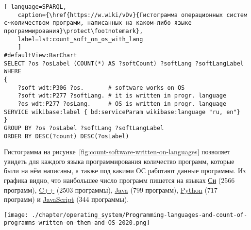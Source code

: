 % 
\begin{lstlisting}[ language=SPARQL, 
	caption={\href{https://w.wiki/vDv}{Гистограмма операционных систем с~количеством программ, написанных на каком-либо языке программирования}\protect\footnotemark},
	label=lst:count_soft_on_os_with_lang
	]
#defaultView:BarChart
SELECT ?os ?osLabel (COUNT(*) AS ?softCount) ?softLang ?softLangLabel
WHERE
{
	?soft wdt:P306 ?os.       # software works on OS
	?soft wdt:P277 ?softLang. # it is written in progr. language
	?os wdt:P277 ?osLang.     # OS is written in progr. language
SERVICE wikibase:label { bd:serviceParam wikibase:language "ru, en"}
}
GROUP BY ?os ?osLabel ?softLang ?softLangLabel
ORDER BY DESC(?count) DESC(?osLabel)
\end{lstlisting}

Гистограмма на рисунке~\ref{fig:count-software-written-on-languages} позволяет увидеть для каждого языка программирования количество программ, которые были на нём написаны, а также под какими ОС работают данные программы. Из графика видно, что наибольшее число программ пишется на языках \href{https://www.wikidata.org/wiki/Q15777}{Си} (2566 программ), \href{https://www.wikidata.org/wiki/Q2407}{C++} (2503 программы), \href{https://www.wikidata.org/wiki/Q251}{Java} (799 программ), \href{https://www.wikidata.org/wiki/Q28865}{Python} (717 программ) и \href{https://www.wikidata.org/wiki/Q2005}{JavaScript} (344 программы).

\begin{figure*}[h!]
	\texttt{[image: ./chapter/operating\_system/Programming-languages-and-count-of-programms-written-on-them-and-OS-2020.png]}
    \caption[Число программ с разбивкой по языкам и ОС, 2020 год.]{Число программ с разбивкой по языкам программирования и операционным системам, под которыми работают программы, написанные на этих языках, 2020 год. Ссылка на SPARQL-запрос: \href{https://w.wiki/4c7d}{https://w.wiki/4c7d}}
	\label{fig:count-software-written-on-languages}
\end{figure*}

